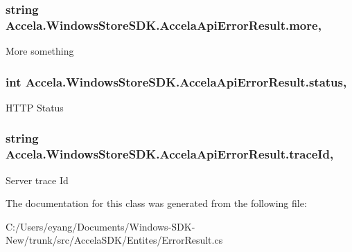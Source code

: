\hypertarget{class_accela_1_1_windows_store_s_d_k_1_1_accela_api_error_result_a1ecd1818eb58c4ec8805d827b45dac2a}{
\subsubsection[{more}]{\setlength{\rightskip}{0pt plus 5cm}string Accela.\+Windows\+Store\+S\+D\+K.\+Accela\+Api\+Error\+Result.\+more\hspace{0.3cm}{\ttfamily [get]}, {\ttfamily [set]}}}\label{class_accela_1_1_windows_store_s_d_k_1_1_accela_api_error_result_a1ecd1818eb58c4ec8805d827b45dac2a}


More something 

\hypertarget{class_accela_1_1_windows_store_s_d_k_1_1_accela_api_error_result_a6d3879256e50f9c91d0de6ce3e17e127}{
\subsubsection[{status}]{\setlength{\rightskip}{0pt plus 5cm}int Accela.\+Windows\+Store\+S\+D\+K.\+Accela\+Api\+Error\+Result.\+status\hspace{0.3cm}{\ttfamily [get]}, {\ttfamily [set]}}}\label{class_accela_1_1_windows_store_s_d_k_1_1_accela_api_error_result_a6d3879256e50f9c91d0de6ce3e17e127}


H\+T\+T\+P Status 

\hypertarget{class_accela_1_1_windows_store_s_d_k_1_1_accela_api_error_result_ab4dde41503b018bc17e2e85718ee57e4}{
\subsubsection[{trace\+Id}]{\setlength{\rightskip}{0pt plus 5cm}string Accela.\+Windows\+Store\+S\+D\+K.\+Accela\+Api\+Error\+Result.\+trace\+Id\hspace{0.3cm}{\ttfamily [get]}, {\ttfamily [set]}}}\label{class_accela_1_1_windows_store_s_d_k_1_1_accela_api_error_result_ab4dde41503b018bc17e2e85718ee57e4}


Server trace Id 



The documentation for this class was generated from the following file\+:\begin{DoxyCompactItemize}
\item 
C\+:/\+Users/eyang/\+Documents/\+Windows-\/\+S\+D\+K-\/\+New/trunk/src/\+Accela\+S\+D\+K/\+Entites/Error\+Result.\+cs\end{DoxyCompactItemize}
